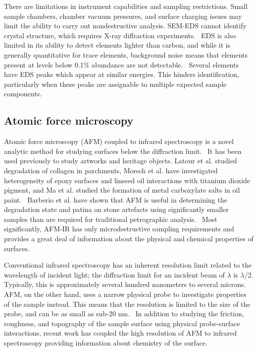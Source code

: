 There are limitations in instrument capabilities and sampling restrictions. Small sample chambers, chamber vacuum pressures, and surface charging issues may limit the ability to carry out nondestructive analysis. SEM-EDS cannot identify crystal structure, which requires X-ray diffraction experiments.~\autocite{Lazzara,Schreiner} EDS is also limited in its ability to detect elements lighter than carbon, and while it is generally quantitative for trace elements, background noise means that elements present at levels below 0.1\% abundance are not detectable.~\autocite{Schreiner,Pradell,Lazzara} Several elements have EDS peaks which appear at similar energies. This hinders identification, particularly when these peaks are assignable to multiple expected sample components.


\subsection[Atomic force microscopy]{Atomic force microscopy}
\label{subsection1.2.3}

Atomic force microscopy (AFM) coupled to infrared spectroscopy is a novel analytic method for studying surfaces below the diffraction limit.~\autocite{dazzi2017,kurouski} It has been used previously to study artworks and heritage objects. Latour et al. studied degradation of collagen in parchments, Morsch et al. have investigated heterogeneity of epoxy surfaces and linseed oil interactions with titanium dioxide pigment, and Ma et al. studied the formation of metal carboxylate salts in oil paint.~\autocite{latour,Morsch,morsch2016,ma} Barberio et al. have shown that AFM is useful in determining the degradation state and patina on stone artefacts using significantly smaller samples than are required for traditional petrographic analysis.~\autocite{Barberio} Most significantly, AFM-IR has only microdestructive sampling requirements and provides a great deal of information about the physical and chemical properties of surfaces.~\autocite{dazzi2017,kurouski}

Conventional infrared spectroscopy has an inherent resolution limit related to the wavelength of incident light; the diffraction limit for an incident beam of $\lambda$ is $\lambda$/2. Typically, this is approximately several hundred nanometers to several microns. AFM, on the other hand, uses a narrow physical probe to investigate properties of the sample instead. This means that the resolution is limited to the size of the probe, and can be as small as sub-20 nm.~\autocite{dazzi2017} In addition to studying the friction, roughness, and topography of the sample surface using physical probe-surface interactions, recent work has coupled the high resolution of AFM to infrared spectroscopy providing information about chemistry of the surface.~\autocite{dazzi2017,kurouski}

